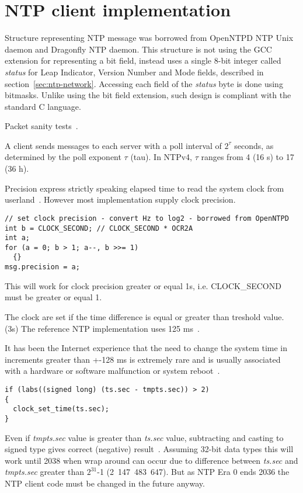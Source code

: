 
\section{NTP client implementation}
Structure representing NTP message was borrowed from OpenNTPD NTP Unix daemon
and Dragonfly NTP daemon.
This structure is not using the GCC extension for representing a bit field,
instead uses a single 8-bit integer called {\it{status}}
for Leap Indicator, Version Number and Mode fields,
described in section~\ref{sec:ntp-network}.
Accessing each field of the {\it{status}} byte is done using bitmasks.
Unlike using the bit field extension,
such design is compliant with the standard C language.


Packet sanity tests~\cite{ntp-arch}.

A client sends messages to each server with a poll interval of $2^{\tau}$
seconds, as determined by the poll exponent $\tau$ (tau).
In NTPv4, $\tau$ ranges from 4 (16 s) to 17 (36 h).


Precision express strictly speaking elapsed time to read the system clock from userland~\cite{ntp-arch}.
However most implementation supply clock precision.
\begin{lstlisting}
// set clock precision - convert Hz to log2 - borrowed from OpenNTPD
int b = CLOCK_SECOND; // CLOCK_SECOND * OCR2A
int a;
for (a = 0; b > 1; a--, b >>= 1)
  {}
msg.precision = a;
\end{lstlisting}
This will work for clock precision greater or equal 1s, i.e. CLOCK\_SECOND must be greater or equal 1.

The clock are set if the time difference is equal or greater than
treshold value. (3s)
The reference NTP implementation uses 125 ms~\cite{rfc5905}.

It has been the Internet
experience that the need to change the system time in increments
greater than +-128 ms is extremely rare and is usually associated
with a hardware or software malfunction or system reboot~\cite{rfc1589}.
\begin{lstlisting}
if (labs((signed long) (ts.sec - tmpts.sec)) > 2)
{
  clock_set_time(ts.sec);
}
\end{lstlisting}
Even if {\it{tmpts.sec}} value is greater than {\it{ts.sec}} value,
subtracting and casting to signed type gives correct (negative) result~\cite{c99}.
Assuming 32-bit data types this will work until 2038 when wrap around can occur due to difference
between {\it{ts.sec}} and {\it{tmpts.sec}} greater than $2^{31}$-1 (2~147~483~647).
But as NTP Era 0 ends 2036 the NTP client code must be changed in the future anyway.

